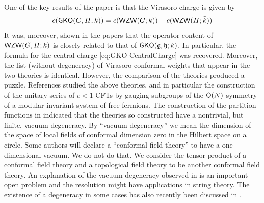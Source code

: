 \documentclass[a4paper,11pt]{article}
\newcommand{\tsf}[1]{\textsf{#1}}
\def\be{ \begin{equation} }
\def\ee{ \end{equation}}
\def\fg{\mathfrak{g}}
\def\fh{\mathfrak{h}}
\begin{document}
One of the key results of the paper \cite{Goddard:1984vk} is that the Virasoro charge is given by 
%
\be\label{eq:GKO-CentralCharge}
c( \mr{GKO}(G,H;k))  = c(\mr{WZW}(G;k))  - c(\mr{WZW}(H;\tilde k) )
\ee
%
It was, moreover, shown in the papers \cite{Bardakci:1987ee,Altschuler:1987zb,rabinovici1988aspects,Gawedzki:1988nj} 
that the operator content of  $\mathsf{WZW}(G,H;k)$ is closely related to that of $\mr{GKO}(\fg,\fh;k)$. 
In particular, the formula for the central charge \eqref{eq:GKO-CentralCharge} was recovered. 
Moreover,   the list (without degeneracy) of Virasoro conformal weights that appear in the two theories is identical. 
However, the comparison of the theories produced a puzzle. References \cite{Bardakci:1987ee,Altschuler:1987zb,rabinovici1988aspects} studied the above theories, and in particular the construction of the unitary series of $c<1$ \tsf{CFT}s by gauging subgroups of the $\mathsf{O}(N)$ symmetry of a modular invariant system of free fermions. The construction of the partition functions in \cite{Bardakci:1987ee,Altschuler:1987zb,rabinovici1988aspects} indicated that the theories so constructed have a nontrivial, but finite, vacuum degeneracy. 
By ``vacuum degeneracy'' we mean the dimension of the space of local  fields of conformal dimension zero in the Hilbert space on a circle. Some authors will declare a ``conformal field theory'' to have a one-dimensional vacuum. We do not do that. We consider the tensor product of a conformal field theory and a topological field theory to be another conformal field theory. An explanation of 
the vacuum degeneracy observed in \cite{Bardakci:1987ee,Altschuler:1987zb,rabinovici1988aspects} is an important open problem and the resolution might have applications in string theory. The existence of a degeneracy in some cases has also recently been discussed in \cite{Komargodski:2020mxz,Cordova:2023jip}.  
\end{document}
